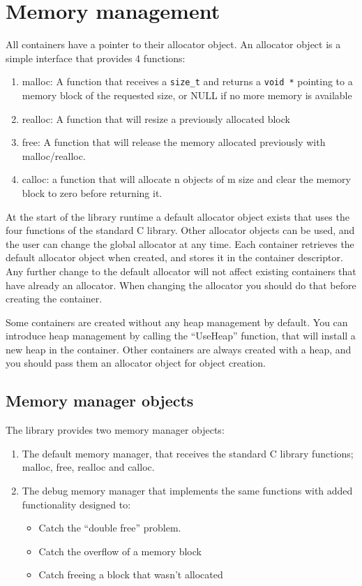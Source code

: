 \documentclass[12pt,a4paper]{memoir} %
\newcommand{\Null}{
{\footnotesize NULL}
}
\begin{document}
\section{Memory management}
All containers have a pointer to their allocator object. An allocator object is a simple interface that provides 4 functions:
\begin{enumerate}
\item malloc: A function that receives a \texttt{size\_t} and returns a \texttt{void *} pointing to a memory block of the requested size, or\Null if no more memory is available
\item realloc: A function that will resize a previously allocated block
\item free: A function that will release the memory allocated previously with malloc/realloc.
\item calloc: a function that will allocate n objects of m size and clear the memory block to zero before returning it. 
\end{enumerate}
At the start of the library runtime a default allocator object exists that uses the four functions of the standard C library. Other allocator objects can be used, and the user can change the global allocator at any time. Each container retrieves the default allocator object when created, and stores it in the container descriptor. Any further change to the default allocator will not affect existing containers that have already an allocator. When changing the allocator you should do that before creating the container.
 
Some containers are created without any heap management by default. You can introduce heap management by calling the “UseHeap” function, that will install a new heap in the container. Other containers are always created with a heap, and you should pass them an allocator object for object creation.

\subsection{Memory manager objects}
The library provides two memory manager objects:
\begin{enumerate}
\item The default memory manager, that receives the standard C library functions; malloc, free, realloc and calloc.
\item The debug memory manager that implements the same functions with added functionality designed to:
\begin{itemize}
\item
Catch the “double free” problem.
\item
Catch the overflow of a memory block
\item
Catch freeing a block that wasn't allocated
\end{itemize}
\end{enumerate}
\end{document}
